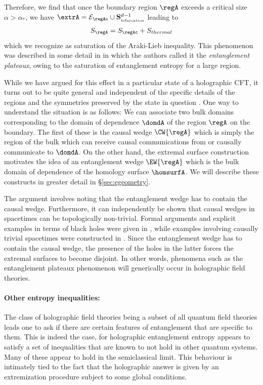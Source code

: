 \documentclass[12pt,openany]{book}
\begin{document}
Therefore, we find that once the boundary region $\regA$ exceeds a critical size $\alpha > \alpha_*$, we have
$\extrA = {\cal E}_{\regAc} \cup {\bf S}^{d-1}_{_\text{bifurcation}}$ leading to
%
\begin{equation}
S_\regA = S_\regAc + S_{thermal}
\label{}
\end{equation}
%
which we recognize as saturation of the Araki-Lieb inequality. This phenomenon was described in some detail in \cite{Hubeny:2013gta} in which the authors called it the {\em entanglement plateaux}, owing to the saturation of entanglement entropy for a large region.

While we have argued for this effect in a particular state of a holographic CFT, it turns out to be quite general and independent of the specific details of the regions and the symmetries preserved by the state in question  \cite{Hubeny:2013gta,Hubeny:2013gba}.  One way to understand the situation is as follows: We can associate two bulk domains corresponding to the domain of dependence $\domdA$ of the region $\regA$ on the boundary. The first of these is the causal wedge $\CW{\regA}$ which is simply the region of the bulk which can receive causal communications from or causally communicate to $\domdA$. On the other hand, the extremal surface construction motivates the idea of an entanglement wedge $\EW{\regA}$ which is the bulk domain of dependence of the homology surface $\homsurfA$.  We will describe these constructs in greater detail in \S\ref{sec:egeometry}.

The argument involves noting that the entanglement wedge has to contain the causal wedge. Furthermore, it can independently be shown that causal wedges in spacetimes can be topologically non-trivial. Formal arguments and explicit examples in terms of black holes were given in \cite{Hubeny:2013gba}, while examples involving causally trivial spacetimes were constructed in \cite{Gentle:2013fma}. Since the entanglement wedge has to contain the causal wedge, the presence of the holes in the latter  forces the extremal surfaces to become disjoint.  In other words,  phenomena such as the entanglement plateaux phenomenon will generically occur in holographic field theories.

\paragraph{Other entropy inequalities:} The class of holographic field theories being a subset of all quantum field theories leads one to ask if there are certain features of entanglement that are specific to them. This is indeed the case, for holographic entanglement entropy appears to satisfy a set of inequalities that are known to not hold in other quantum systems. Many of these appear to hold in the semiclassical limit. This behaviour is intimately tied to the fact that the holographic answer is given by an extremization procedure subject to some global conditions.
\end{document}
